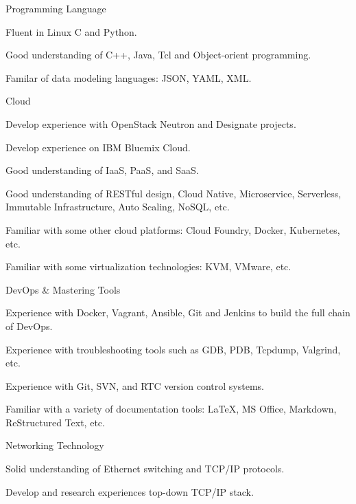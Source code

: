 \begin{cventries}
  \cventry
    {Programming Language}
    {}
    {}
    {}
    {
      \begin{cvitems}
        \item {Fluent in Linux C and Python.}
        \item {Good understanding of C++, Java, Tcl and Object-orient programming.}
        \item {Familar of data modeling languages: JSON, YAML, XML.}
      \end{cvitems}
    }

    \cventry
    {Cloud}
    {}
    {}
    {}
    {
      \begin{cvitems}
        \item {Develop experience with OpenStack Neutron and Designate projects.}
        \item {Develop experience on IBM Bluemix Cloud.}
        \item {Good understanding of IaaS, PaaS, and SaaS.}
        \item {Good understanding of RESTful design, Cloud Native, Microservice, Serverless, Immutable Infrastructure, Auto Scaling, NoSQL, etc.}
        \item {Familiar with some other cloud platforms: Cloud Foundry, Docker, Kubernetes, etc.}
        \item {Familiar with some virtualization technologies: KVM, VMware, etc.}
      \end{cvitems}
    }

    \cventry
    {DevOps \& Mastering Tools}
    {}
    {}
    {}
    {
      \begin{cvitems}
        \item {Experience with Docker, Vagrant, Ansible, Git and Jenkins to build the full chain of DevOps.}
        \item {Experience with troubleshooting tools such as GDB, PDB, Tcpdump, Valgrind, etc.}
        \item {Experience with Git, SVN, and RTC version control systems.}
        \item {Familiar with a variety of documentation tools: \LaTeX{}, MS Office, Markdown, ReStructured Text, etc.}
      \end{cvitems}
    }
    
    \cventry
    {Networking Technology}
    {}
    {}
    {}
    {
      \begin{cvitems}
        \item {Solid understanding of Ethernet switching and TCP/IP protocols.}
        \item {Develop and research experiences top-down TCP/IP stack.}
      \end{cvitems}
    }
\end{cventries}
